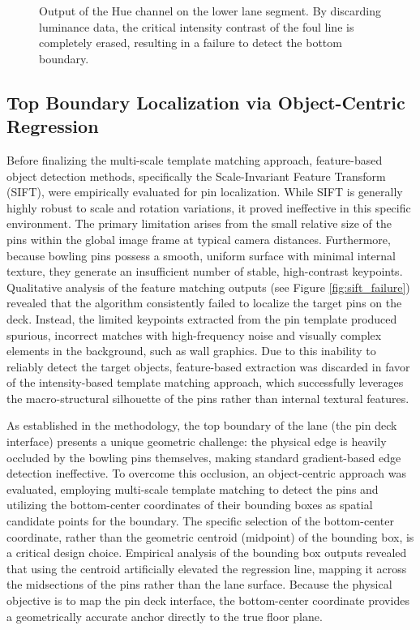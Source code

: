 \begin{figure}[htbp]
    \centering
    \caption{Output of the Hue channel on the lower lane segment. By discarding luminance data, the critical intensity contrast of the foul line is completely erased, resulting in a failure to detect the bottom boundary.}
    \label{fig:hue_failure}
\end{figure}




\subsection{Top Boundary Localization via Object-Centric Regression}

Before finalizing the multi-scale template matching approach, feature-based object detection methods, specifically the Scale-Invariant Feature Transform (SIFT), were empirically evaluated for pin localization. While SIFT is generally highly robust to scale and rotation variations, it proved ineffective in this specific environment. The primary limitation arises from the small relative size of the pins within the global image frame at typical camera distances. Furthermore, because bowling pins possess a smooth, uniform surface with minimal internal texture, they generate an insufficient number of stable, high-contrast keypoints. Qualitative analysis of the feature matching outputs (see Figure \ref{fig:sift_failure}) revealed that the algorithm consistently failed to localize the target pins on the deck. Instead, the limited keypoints extracted from the pin template produced spurious, incorrect matches with high-frequency noise and visually complex elements in the background, such as wall graphics. Due to this inability to reliably detect the target objects, feature-based extraction was discarded in favor of the intensity-based template matching approach, which successfully leverages the macro-structural silhouette of the pins rather than internal textural features.

As established in the methodology, the top boundary of the lane (the pin deck interface) presents a unique geometric challenge: the physical edge is heavily occluded by the bowling pins themselves, making standard gradient-based edge detection ineffective. To overcome this occlusion, an object-centric approach was evaluated, employing multi-scale template matching to detect the pins and utilizing the bottom-center coordinates of their bounding boxes as spatial candidate points for the boundary. The specific selection of the bottom-center coordinate, rather than the geometric centroid (midpoint) of the bounding box, is a critical design choice. Empirical analysis of the bounding box outputs revealed that using the centroid artificially elevated the regression line, mapping it across the midsections of the pins rather than the lane surface. Because the physical objective is to map the pin deck interface, the bottom-center coordinate provides a geometrically accurate anchor directly to the true floor plane.

